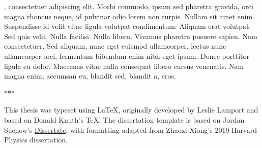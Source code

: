 
, consectetuer adipiscing elit. Morbi commodo, ipsum sed pharetra gravida, orci magna rhoncus neque, id pulvinar odio lorem non turpis. Nullam sit amet enim. Suspendisse id velit vitae ligula volutpat condimentum. Aliquam erat volutpat. Sed quis velit. Nulla facilisi. Nulla libero. Vivamus pharetra posuere sapien. Nam consectetuer. Sed aliquam, nunc eget euismod ullamcorper, lectus nunc ullamcorper orci, fermentum bibendum enim nibh eget ipsum. Donec porttitor ligula eu dolor. Maecenas vitae nulla consequat libero cursus venenatis. Nam magna enim, accumsan eu, blandit sed, blandit a, eros.


\begin{center}
$\ast$\hspace{0.2in}$\ast$\hspace{0.2in}$\ast$
\end{center}

This thesis was typeset using \LaTeX, originally developed by Leslie Lamport and
based on Donald Knuth's \TeX. The dissertation template is based on Jordan
Suchow's \href{https://github.com/suchow/Dissertate}{Dissertate}, with formatting
adapted from Zhaoxi Xiong's 2019 Harvard Physics dissertation.
